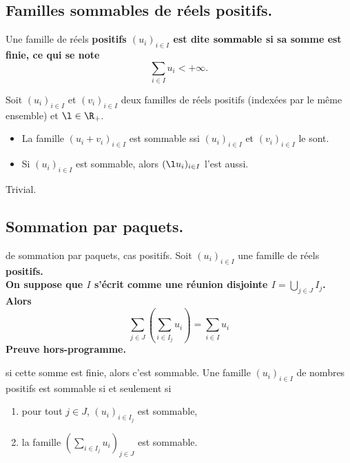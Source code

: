 \documentclass[11pt]{article}
\begin{document}
\subsection{Familles sommables de réels positifs.}

\begin{defi}{}{}
    Une famille de réels \bf{positifs} $(u_i)_{i\in I}$ est dite $\bf{sommable}$ si sa somme est finie, ce qui se note
    \begin{equation*}
        \sum_{i\in I}u_i < +\infty.
    \end{equation*}
\end{defi}

\begin{prop}{}{}
    Soit $(u_i)_{i\in I}$ et $(v_i)_{i\in I}$ deux familles de réels positifs (indexées par le même ensemble) et $\l\in\R_+$.
    \begin{itemize}[topsep=0pt,itemsep=-0.9 ex]
        \item La famille $(u_i+v_i)_{i\in I}$ est sommable ssi $(u_i)_{i\in I}$ et $(v_i)_{i\in I}$ le sont.
        \item Si $(u_i)_{i\in I}$ est sommable, alors $(\l u_i)_{i\in I}$ l'est aussi.
    \end{itemize}
    \tcblower
    Trivial.
\end{prop}

\subsection{Sommation par paquets.}

\begin{thm}{de sommation par paquets, cas positifs.}{}
    Soit $(u_i)_{i\in I}$ une famille de réels \bf{positifs}.\\
    On suppose que $I$ s'écrit comme une réunion \bf{disjointe} $I=\bigcup_{j\in J}I_j$. Alors
    \begin{equation*}
        \sum_{j\in J}\left( \sum_{i\in I_j}u_i \right) = \sum_{i\in I}u_i
    \end{equation*}
    \tcblower
    Preuve hors-programme. 
\end{thm}

\begin{corr}{si cette somme est finie, alors c'est sommable.}{}
    Une famille $(u_i)_{i\in I}$ de nombres positifs est sommable si et seulement si
    \begin{enumerate}[topsep=0pt,itemsep=-0.9 ex]
        \item pour tout $j\in J$, $(u_i)_{i\in I_j}$ est sommable,
        \item la famille $(\sum\limits_{i\in I_j}u_i)_{j\in J}$ est sommable.
    \end{enumerate}
\end{corr}
\end{document}
